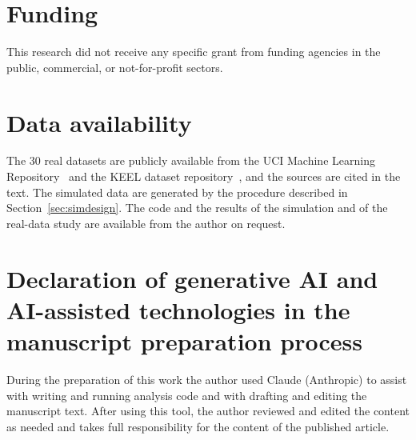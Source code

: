 \documentclass[preprint,12pt]{elsarticle}
\begin{document}
\section*{Funding}
This research did not receive any specific grant from funding agencies in the public, commercial, or not-for-profit sectors.

\section*{Data availability}
The 30 real datasets are publicly available from the UCI Machine Learning Repository~\cite{UCI} and the KEEL dataset repository~\cite{Alcala2011}, and the sources are cited in the text. The simulated data are generated by the procedure described in Section~\ref{sec:simdesign}. The code and the results of the simulation and of the real-data study are available from the author on request.

\section*{Declaration of generative AI and AI-assisted technologies in the manuscript preparation process}
During the preparation of this work the author used Claude (Anthropic) to assist with writing and running analysis code and with drafting and editing the manuscript text. After using this tool, the author reviewed and edited the content as needed and takes full responsibility for the content of the published article.



\end{document}
